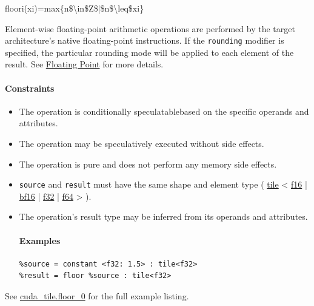 \documentclass{article}
\begin{document}
floori(xi)=max\{n\$\textbackslash{}in\$Z\$|\$n\$\textbackslash{}leq\$xi\}

Element-wise floating-point arithmetic operations are performed by the target architecture's native floating-point instructions. If the \texttt{rounding} modifier is specified, the particular rounding mode will be applied to each element of the result. See \href{https://docs.nvidia.com/cuda/tile-ir/latest/sections/operations.html#op-group-floating-point}{Floating Point} for more details.



\paragraph{Constraints}

\begin{itemize}
\item The operation is conditionally speculatablebased on the specific operands and attributes.
\item The operation may be speculatively executed without side effects.
\item The operation is pure and does not perform any memory side effects.
\item \texttt{source} and \texttt{result} must have the same shape and element type ( \href{https://docs.nvidia.com/cuda/tile-ir/latest/sections/types.html#type-tile}{tile} < \href{https://docs.nvidia.com/cuda/tile-ir/latest/sections/types.html#subsection-element-types}{f16} | \href{https://docs.nvidia.com/cuda/tile-ir/latest/sections/types.html#subsection-element-types}{bf16} | \href{https://docs.nvidia.com/cuda/tile-ir/latest/sections/types.html#subsection-element-types}{f32} | \href{https://docs.nvidia.com/cuda/tile-ir/latest/sections/types.html#subsection-element-types}{f64} > ).
\item The operation's result type may be inferred from its operands and attributes.


\paragraph{Examples}

\begin{lstlisting}
%source = constant <f32: 1.5> : tile<f32>
%result = floor %source : tile<f32>
\end{lstlisting}

\end{itemize}
See \href{https://docs.nvidia.com/cuda/tile-ir/latest/sections/appendix.html#example-cuda-tile-floor-0}{cuda\_tile.floor\_0} for the full example listing.
\end{document}
